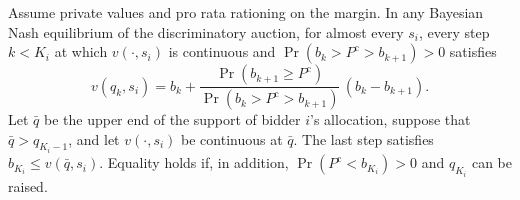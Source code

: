 \begin{proposition}\label{prop:15-chk}
Assume private values and pro rata rationing on the margin. In any Bayesian Nash equilibrium of the
discriminatory auction, for almost every $s_i$, every step $k<K_i$ at which $v(\cdot,s_i)$ is continuous and
$\Pr(b_k>P^{\mathrm c}>b_{k+1})>0$ satisfies
\begin{equation}\label{eq:15-chk-foc}
v(q_k,s_i)=b_k+\frac{\Pr(b_{k+1}\ge P^{\mathrm c})}{\Pr(b_k>P^{\mathrm c}>b_{k+1})}\,(b_k-b_{k+1}) .
\end{equation}
Let $\bar q$ be the upper end of the support of bidder $i$'s allocation, suppose that $\bar q>q_{K_i-1}$, and let $v(\cdot,s_i)$ be continuous at
$\bar q$. The last step satisfies $b_{K_i}\le v(\bar q,s_i)$. Equality holds if, in addition,
$\Pr(P^{\mathrm c}<b_{K_i})>0$ and $q_{K_i}$ can be raised.
\end{proposition}

